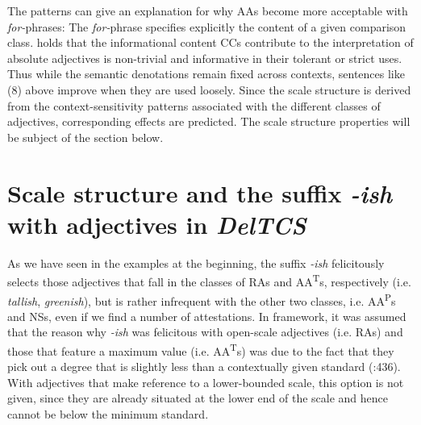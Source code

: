 \documentclass[output=paper
,modfonts
,nonflat]{langsci/langscibook}
\begin{document}
The patterns can give an explanation for why AAs become more acceptable with  \textit{for-}phrases: The  \textit{for-}phrase specifies explicitly the content of a given comparison class. \textcite[86]{Burnett2017} holds that the informational content CCs contribute to the interpretation of absolute adjectives is non-trivial and informative in their tolerant or strict uses. Thus while the semantic denotations remain fixed across contexts, sentences like (8) above improve when they are used loosely.
Since the scale structure is derived from the context-sensitivity patterns associated with the different classes of adjectives, corresponding effects are predicted. The scale structure properties will be subject of the section below.

\section{Scale structure and the suffix \textit{-ish} with adjectives in \textit{DelTCS}}
\label{scale-ish-deltcs}

As we have seen in the examples at the beginning, the suffix \textit{-ish} felicitously selects those adjectives that fall in the classes of RAs and AA\textsuperscript{T}s, respectively (i.e. \textit{tallish}, \textit{greenish}), but is rather infrequent with the other two classes, i.e. AA\textsuperscript{P}s and NSs, even if we find a number of attestations.
In \citet*{Bochnak2014} framework, it was assumed that the reason why \textit{-ish} was felicitous with open-scale adjectives (i.e. RAs) and those that feature a maximum value (i.e. AA\textsuperscript{T}s) was due to the fact that they pick out a degree that is slightly less than a contextually given standard (\citeyear{Bochnak2014}:436). With adjectives that make reference to a lower-bounded scale, this option is not given, since they are already situated at the lower end of the scale and hence cannot be below the minimum standard.
\end{document}
